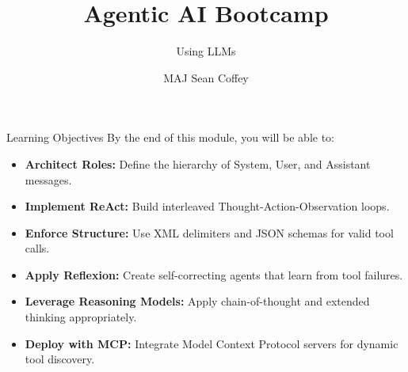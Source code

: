 \documentclass{beamer}       %
\title[]{Agentic AI Bootcamp}
\subtitle[] %
{Using LLMs}
\author[] %
{MAJ Sean Coffey} %
\institute
{Army Cyber Institute, U.S. Military Academy}
\date{\monthyeardate}
\begin{document}
{\DivisionLogo
\begin{frame}
    \titlepage
\end{frame}
}

\begin{frame}{Learning Objectives}
    By the end of this module, you will be able to:
    \begin{itemize}
        \item \textbf{Architect Roles:} Define the hierarchy of System, User, and Assistant messages.
        \item \textbf{Implement ReAct:} Build interleaved Thought-Action-Observation loops.
        \item \textbf{Enforce Structure:} Use XML delimiters and JSON schemas for valid tool calls.
        \item \textbf{Apply Reflexion:} Create self-correcting agents that learn from tool failures.
        \item \textbf{Leverage Reasoning Models:} Apply chain-of-thought and extended thinking appropriately.
        \item \textbf{Deploy with MCP:} Integrate Model Context Protocol servers for dynamic tool discovery.
    \end{itemize}
\end{frame}
\end{document}
